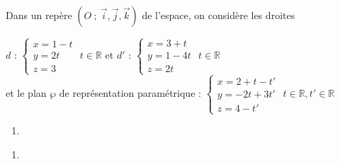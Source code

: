 \documentclass{cornouaille}
\begin{document}
\enlargethispage{2cm}


\begin{QCM}
\begin{EnonceCommunQCM}
  Dans un repère
  $(O\ ;\ \overrightarrow{i},\overrightarrow{j},\overrightarrow{k})$ de
  l'espace, on considère les droites 

  $d$ :
  $\begin{cases}x=1-t \\y=2t \\z=3 \end{cases}$ $t\in\mathbb{R}$ et
  $d'$ :
  $\begin{cases}x=3+t \\y=1-4t \\z=2t \end{cases}$  $t\in\mathbb{R}$\\
  et le plan $\wp$  de représentation paramétrique :
  $\begin{cases}x=2+t-t' \\y=-2t+3t' \\z=4-t' \end{cases}$
  $t\in\mathbb{R}, t'\in\mathbb{R}$
\end{EnonceCommunQCM}
\begin{GroupeQCM}
  \begin{enumerate}
\setcounter{enumi}{\value{questionqcm}}
\item 
  \end{enumerate}
\begin{solution}
\end{solution}


  \begin{enumerate}
\setcounter{enumi}{\value{questionqcm}}
\item 
  \end{enumerate}
\begin{solution}
\end{solution}


\end{GroupeQCM}
\end{QCM}
\end{document}
